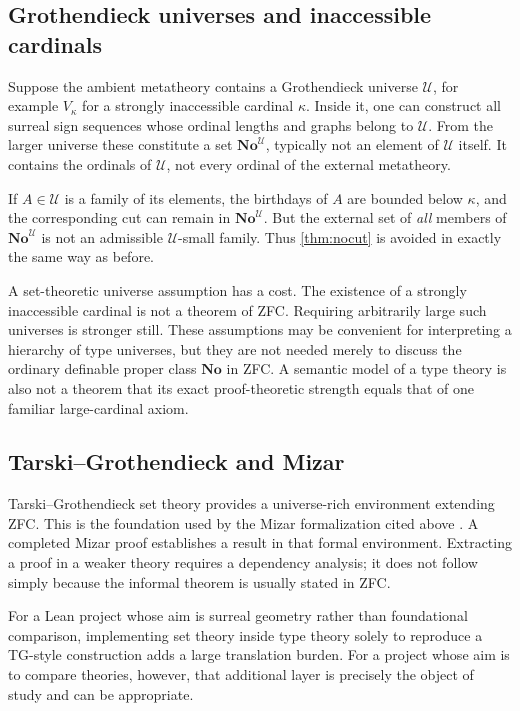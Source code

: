 \documentclass[11pt,letterpaper]{article}
\numberwithin{equation}{section}
\theoremstyle{definition}
\theoremstyle{remark}
\newcommand{\No}{\mathbf{No}}
\newcommand{\UU}{\mathcal{U}}
\begin{document}
\subsection{Grothendieck universes and inaccessible cardinals}
Suppose the ambient metatheory contains a Grothendieck universe $\UU$, for example $V_\kappa$ for a strongly inaccessible cardinal $\kappa$. Inside it, one can construct all surreal sign sequences whose ordinal lengths and graphs belong to $\UU$. From the larger universe these constitute a set $\No^{\UU}$, typically not an element of $\UU$ itself. It contains the ordinals of $\UU$, not every ordinal of the external metatheory.

If $A\in\UU$ is a family of its elements, the birthdays of $A$ are bounded below $\kappa$, and the corresponding cut can remain in $\No^{\UU}$. But the external set of \emph{all} members of $\No^{\UU}$ is not an admissible $\UU$-small family. Thus \cref{thm:nocut} is avoided in exactly the same way as before.

A set-theoretic universe assumption has a cost. The existence of a strongly inaccessible cardinal is not a theorem of ZFC. Requiring arbitrarily large such universes is stronger still. These assumptions may be convenient for interpreting a hierarchy of type universes, but they are not needed merely to discuss the ordinary definable proper class $\No$ in ZFC. A semantic model of a type theory is also not a theorem that its exact proof-theoretic strength equals that of one familiar large-cardinal axiom.

\subsection{Tarski--Grothendieck and Mizar}
Tarski--Grothendieck set theory provides a universe-rich environment extending ZFC. This is the foundation used by the Mizar formalization cited above \cite{PakKaliszyk}. A completed Mizar proof establishes a result in that formal environment. Extracting a proof in a weaker theory requires a dependency analysis; it does not follow simply because the informal theorem is usually stated in ZFC.

For a Lean project whose aim is surreal geometry rather than foundational comparison, implementing set theory inside type theory solely to reproduce a TG-style construction adds a large translation burden. For a project whose aim is to compare theories, however, that additional layer is precisely the object of study and can be appropriate.
\end{document}
